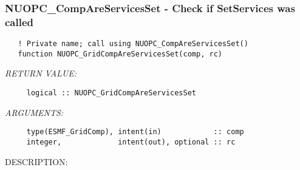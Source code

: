  
\setlength{\oldparskip}{\parskip}
\setlength{\parskip}{1.5ex}
\setlength{\oldparindent}{\parindent}
\setlength{\parindent}{0pt}
\setlength{\oldbaselineskip}{\baselineskip}
\setlength{\baselineskip}{11pt}
 
\def\bv{\begin{verbatim}}
\def\ev{\end{verbatim}}
\def\be{\begin{equation}}
\def\ee{\end{equation}}
\def\bea{\begin{eqnarray}}
\def\eea{\end{eqnarray}}
\def\bi{\begin{itemize}}
\def\ei{\end{itemize}}
\def\bn{\begin{enumerate}}
\def\en{\end{enumerate}}
\def\bd{\begin{description}}
\def\ed{\end{description}}
\def\({\left (}
\def\){\right )}
\def\[{\left [}
\def\]{\right ]}
\def\<{\left  \langle}
\def\>{\right \rangle}
\def\cI{{\cal I}}
\def\diag{\mathop{\rm diag}}
\def\tr{\mathop{\rm tr}}


 
\subsubsection [NUOPC\_CompAreServicesSet] {NUOPC\_CompAreServicesSet - Check if SetServices was called}


\begin{verbatim}   ! Private name; call using NUOPC_CompAreServicesSet() 
   function NUOPC_GridCompAreServicesSet(comp, rc)\end{verbatim}{\em RETURN VALUE:}
\begin{verbatim}     logical :: NUOPC_GridCompAreServicesSet\end{verbatim}{\em ARGUMENTS:}
\begin{verbatim}     type(ESMF_GridComp), intent(in)            :: comp
     integer,             intent(out), optional :: rc\end{verbatim}
{\sf DESCRIPTION:\\ }


